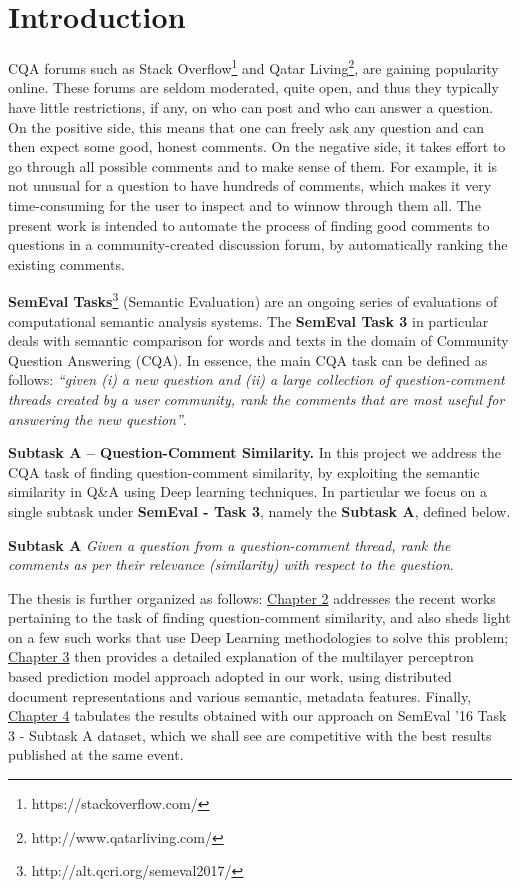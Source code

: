 \documentclass[12pt, a4paper, oneside]{Thesis} %
\newcommand{\mychapter}[2]{
    \setcounter{chapter}{#1}
    \setcounter{section}{0}
    \chapter*{#2}
    \addcontentsline{toc}{chapter}{#2}
    \lhead{\emph{#2}}
}
\begin{document}

\mychapter{1}{Introduction}

CQA forums such as Stack Overflow\footnote{https://stackoverflow.com/} and Qatar Living\footnote{http://www.qatarliving.com/}, are gaining popularity online. These forums are seldom moderated, quite open, and thus they typically have little restrictions, if any, on who can post and who can answer a question. On the positive side, this means that one can freely ask any question and can then expect some good, honest comments. On the negative side, it takes effort to go through all possible comments and to make sense of them. For example, it is not unusual for a question to have hundreds of comments, which makes it very time-consuming for the user to inspect and to winnow through them all. The present work is intended to automate the process of finding good comments to questions in a community-created discussion forum, by automatically ranking the existing comments.

\textbf{SemEval Tasks}\footnote{http://alt.qcri.org/semeval2017/} (Semantic Evaluation) are an ongoing series of evaluations of computational semantic analysis systems. The \textbf{SemEval Task 3} in particular deals with semantic comparison for words and texts in the domain of Community Question Answering (CQA). In essence, the main CQA task can be defined as follows: \textit{“given (i) a new question and (ii) a large collection of question-comment threads created by a user community, rank the comments that are most useful for answering the new question”}.

\textbf{Subtask A -- Question-Comment Similarity.} In this project we address the CQA task of finding question-comment similarity, by exploiting the semantic similarity in Q\&A using Deep learning techniques. In particular we focus on a single subtask under \textbf{SemEval - Task 3}, namely the \textbf{Subtask A}, defined below.

\textbf{Subtask A} \textit{Given a question from a question-comment thread, rank the comments as per their relevance (similarity) with respect to the question}.

The thesis is further organized as follows: \hyperref[chap:lit-survery]{Chapter 2} addresses the recent works pertaining to the task of finding question-comment similarity, and also sheds light on a few such works that use Deep Learning methodologies to solve this problem; \hyperref[chap:approach]{Chapter 3} then provides a detailed explanation of the multilayer perceptron based prediction model approach adopted in our work, using distributed document representations and various semantic, metadata features. Finally, \hyperref[chap:exp]{Chapter 4} tabulates the results obtained with our approach on SemEval '16 Task 3 - Subtask A dataset, which we shall see are competitive with the best results published at the same event.
\end{document}
